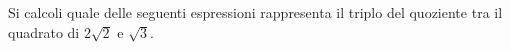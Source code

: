 Si calcoli quale delle seguenti espressioni rappresenta 
il triplo del quoziente tra il quadrato di $2 \sqrt{2}$ e $\sqrt{3}$. 